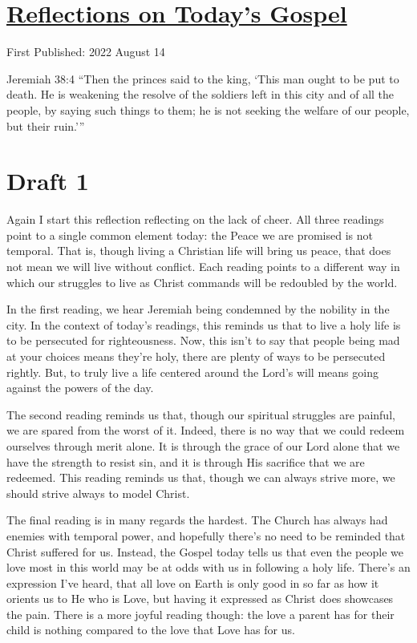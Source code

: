 \documentclass[12pt]{article}[titlepage]
\newcommand{\say}[1]{``#1''}
\newcommand{\nsay}[1]{`#1'}
\newcommand{\1}{\={a}}
\newcommand{\2}{\={e}}
\newcommand{\3}{\={\i}}
\newcommand{\4}{\=o}
\newcommand{\5}{\=u}
\newcommand{\6}{\={A}}
\renewcommand{\,}{\textsuperscript{,}}
\begin{document}
\doublespacing
\section{\href{reflections-on-readings-20-ordinary-c-22.html}{Reflections on Today's Gospel}}
First Published: 2022 August 14

Jeremiah 38:4 \say{Then the princes said to the king, \nsay{This man ought to be put to death. He is weakening the resolve of the soldiers left in this city and of all the people, by saying such things to them; he is not seeking the welfare of our people, but their ruin.}}

\section{Draft 1}
Again I start this reflection reflecting on the lack of cheer.
All three readings point to a single common element today: the Peace we are promised is not temporal.
That is, though living a Christian life will bring us peace, that does not mean we will live without conflict.
Each reading points to a different way in which our struggles to live as Christ commands will be redoubled by the world.

In the first reading, we hear Jeremiah being condemned by the nobility in the city.
In the context of today's readings, this reminds us that to live a holy life is to be persecuted for righteousness.
Now, this isn't to say that people being mad at your choices means they're holy, there are plenty of ways to be persecuted rightly.
But, to truly live a life centered around the Lord's will means going against the powers of the day.

The second reading reminds us that, though our spiritual struggles are painful, we are spared from the worst of it.
Indeed, there is no way that we could redeem ourselves through merit alone.
It is through the grace of our Lord alone that we have the strength to resist sin, and it is through His sacrifice that we are redeemed.
This reading reminds us that, though we can always strive more, we should strive always to model Christ.

The final reading is in many regards the hardest.
The Church has always had enemies with temporal power, and hopefully there's no need to be reminded that Christ suffered for us.
Instead, the Gospel today tells us that even the people we love most in this world may be at odds with us in following a holy life.
There's an expression I've heard, that all love on Earth is only good in so far as how it orients us to He who is Love, but having it expressed as Christ does showcases the pain.
There is a more joyful reading though: the love a parent has for their child is nothing compared to the love that Love has for us.
\end{document}
